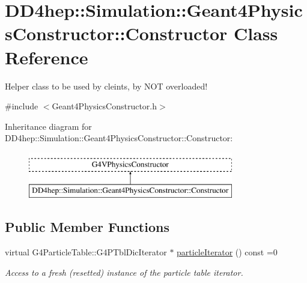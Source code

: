 \hypertarget{class_d_d4hep_1_1_simulation_1_1_geant4_physics_constructor_1_1_constructor}{}\section{D\+D4hep\+:\+:Simulation\+:\+:Geant4\+Physics\+Constructor\+:\+:Constructor Class Reference}
\label{class_d_d4hep_1_1_simulation_1_1_geant4_physics_constructor_1_1_constructor}


Helper class to be used by cleints, by N\+OT overloaded!  




{\ttfamily \#include $<$Geant4\+Physics\+Constructor.\+h$>$}

Inheritance diagram for D\+D4hep\+:\+:Simulation\+:\+:Geant4\+Physics\+Constructor\+:\+:Constructor\+:\begin{figure}[H]
\begin{center}
\leavevmode
\includegraphics[height=2.000000cm]{class_d_d4hep_1_1_simulation_1_1_geant4_physics_constructor_1_1_constructor}
\end{center}
\end{figure}
\subsection*{Public Member Functions}
\begin{DoxyCompactItemize}
\item 
virtual G4\+Particle\+Table\+::\+G4\+P\+Tbl\+Dic\+Iterator $\ast$ \hyperlink{class_d_d4hep_1_1_simulation_1_1_geant4_physics_constructor_1_1_constructor_a53dfd498fc3e9a35224537d9706849d7}{particle\+Iterator} () const =0
\begin{DoxyCompactList}\small\item\em Access to a fresh (resetted) instance of the particle table iterator. \end{DoxyCompactList}\end{DoxyCompactItemize}
